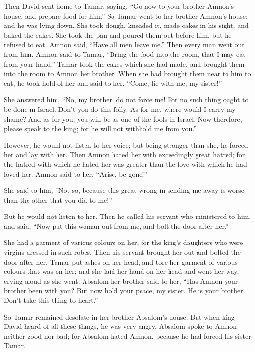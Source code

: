  Then David sent home to Tamar, saying, ``Go now to your
brother Amnon's house, and prepare food for him.''  So
Tamar went to her brother Amnon's house; and he was lying down. She took
dough, kneaded it, made cakes in his sight, and baked the cakes.
 She took the pan and poured them out before him, but he
refused to eat. Amnon said, ``Have all men leave me.'' Then every man
went out from him.  Amnon said to Tamar, ``Bring the food
into the room, that I may eat from your hand.'' Tamar took the cakes
which she had made, and brought them into the room to Amnon her brother.
 When she had brought them near to him to eat, he took
hold of her and said to her, ``Come, lie with me, my sister!''

 She answered him, ``No, my brother, do not force me! For
no such thing ought to be done in Israel. Don't you do this folly.
 As for me, where would I carry my shame? And as for you,
you will be as one of the fools in Israel. Now therefore, please speak
to the king; for he will not withhold me from you.''

 However, he would not listen to her voice; but being
stronger than she, he forced her and lay with her.  Then
Amnon hated her with exceedingly great hatred; for the hatred with which
he hated her was greater than the love with which he had loved her.
Amnon said to her, ``Arise, be gone!''

 She said to him, ``Not so, because this great wrong in
sending me away is worse than the other that you did to me!''

But he would not listen to her.  Then he called his
servant who ministered to him, and said, ``Now put this woman out from
me, and bolt the door after her.''

 She had a garment of various colours on her, for the
king's daughters who were virgins dressed in such robes. Then his
servant brought her out and bolted the door after her. 
Tamar put ashes on her head, and tore her garment of various colours
that was on her; and she laid her hand on her head and went her way,
crying aloud as she went.  Absalom her brother said to
her, ``Has Amnon your brother been with you? But now hold your peace, my
sister. He is your brother. Don't take this thing to heart.''

So Tamar remained desolate in her brother Absalom's house.
 But when king David heard of all these things, he was
very angry.  Absalom spoke to Amnon neither good nor bad;
for Absalom hated Amnon, because he had forced his sister Tamar.

